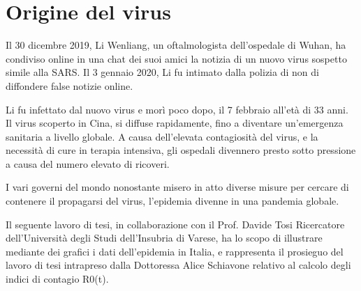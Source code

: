 
\section{Origine del virus}
Il 30 dicembre 2019, Li Wenliang, un oftalmologista dell’ospedale di Wuhan, ha condiviso online in una chat dei suoi amici la notizia di un nuovo virus sospetto simile alla SARS.
Il 3 gennaio 2020, Li fu intimato dalla polizia di non di diffondere false notizie online.

\noindent Li fu infettato dal nuovo virus e morì poco dopo, il 7 febbraio all’età di 33 anni.
Il virus scoperto in Cina, si diffuse rapidamente, fino a diventare un'emergenza sanitaria a livello globale.
A causa dell’elevata contagiosità del virus, e la necessità di cure in terapia intensiva, gli ospedali divennero presto sotto pressione a causa del numero elevato di ricoveri.

\noindent I vari governi del mondo nonostante misero in atto diverse misure per cercare di contenere il propagarsi  del virus,  l'epidemia divenne in una pandemia globale.

\noindent Il seguente lavoro di tesi, in collaborazione con il Prof. Davide Tosi Ricercatore dell’Università degli Studi dell’Insubria di Varese,  ha lo scopo di illustrare mediante dei grafici i dati dell’epidemia in Italia, e rappresenta il prosieguo del lavoro di tesi intrapreso dalla Dottoressa Alice Schiavone relativo al calcolo degli indici di contagio R0(t).